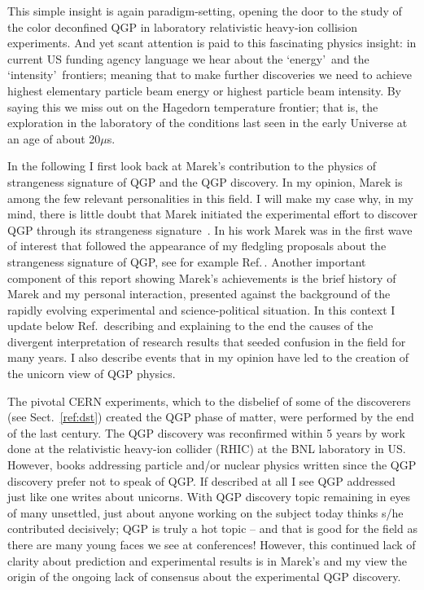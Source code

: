 \documentclass{appolb}
\begin{document}
This simple insight is again paradigm-setting, opening the door to the study of the color deconfined QGP in laboratory relativistic heavy-ion collision experiments. And yet scant attention is paid to this fascinating physics insight: in current US funding agency language we hear about the \lq energy\rq\ and the \lq intensity\rq\ frontiers; meaning that to make further discoveries we need to achieve highest elementary particle beam energy or highest particle beam intensity. By saying this we miss out on the Hagedorn temperature frontier; that is, the exploration in the laboratory of the conditions last seen in the early Universe at an age of about 20\;$\mu$s.

In the following I first look back at Marek\rq s contribution to the physics of strangeness signature of QGP and the QGP discovery. In my opinion, Marek is among the few relevant personalities in this field. I will make my case why, in my mind, there is little doubt that Marek initiated the experimental effort to discover QGP through its strangeness signature~\cite{Anikina:1984zh}. In his work Marek was in the first wave of interest that followed the appearance of my fledgling proposals about the strangeness signature of QGP, see for example Ref.\,\cite{Rafelski:1980fy}. Another important component of this report showing Marek\rq s achievements is the brief history of Marek and my personal interaction, presented against the background of the rapidly evolving experimental and science-political situation. In this context I update below Ref.\,\cite{Rafelski:2015cxa} describing and explaining to the end the causes of the divergent interpretation of research results that seeded confusion in the field for many years. I also describe events that in my opinion have led to the creation of the unicorn view of QGP physics. 

The pivotal CERN experiments, which to the disbelief of some of the discoverers (see Sect.~\ref{ref:dst}) created the QGP phase of matter, were performed by the end of the last century. The QGP discovery was reconfirmed within 5 years by work done at the relativistic heavy-ion collider (RHIC) at the BNL laboratory in US. However, books addressing particle and/or nuclear physics written since the QGP discovery prefer not to speak of QGP. If described at all I see QGP addressed just like one writes about unicorns. With QGP discovery topic remaining in eyes of many unsettled, just about anyone working on the subject today thinks s/he contributed decisively; QGP is truly a hot topic -- and that is good for the field as there are many young faces we see at conferences! However, this continued lack of clarity about prediction and experimental results is in Marek\rq s and my view the origin of the ongoing lack of consensus about the experimental QGP discovery.
\end{document}
